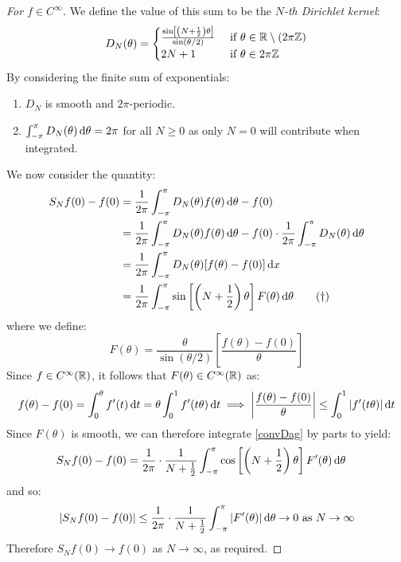 \documentclass[../main.tex]{subfiles}
\begin{document}
\begin{proof}[For $f \in C^\infty$]
  We define the value of this sum to be the \textit{$N$-th Dirichlet kernel}:
  \[
    D_{N}(\theta) = \begin{cases}
    \frac{\sin\left[\left(N + \frac{1}{2}\right)\theta\right]}{\sin(\theta/2)} & \text{ if } \theta \in \mathbb{R} \setminus (2 \pi \mathbb{Z}) \\
    2N + 1 & \text{ if } \theta \in 2 \pi \mathbb{Z}
    \end{cases}
  \]
  By considering the finite sum of exponentials:
  \begin{enumerate}
    \item $D_N$ is smooth and $2\pi$-periodic.
    \item $\int_{-\pi}^{\pi} D_{N}(\theta) \d{\theta} = 2 \pi$ for all $N \geq 0$ as only $N = 0$ will contribute when integrated.
  \end{enumerate}
  We now consider the quantity:
  \begin{align}
    S_{N}f(0) - f(0) &= \frac{1}{2\pi} \int_{-\pi}^{\pi} D_N(\theta) f(\theta) \d{\theta} - f(0) \nonumber \\
                     &= \frac{1}{2\pi} \int_{-\pi}^{\pi} D_N(\theta) f(\theta) \d{\theta} - f(0) \cdot \frac{1}{2\pi} \int_{-\pi}^{\pi} D_N(\theta) \d{\theta} \nonumber \\
                     &= \frac{1}{2\pi} \int_{-\pi}^{\pi} D_N(\theta)[f(\theta) - f(0)] \d{x} \nonumber \\
                     &= \frac{1}{2\pi} \int_{-\pi}^{\pi} \sin\left[\left(N + \frac{1}{2}\right)\theta\right] F(\theta) \d{\theta} \tag{$\dag$} \label{convDag}
  \end{align}
  where we define:
  \[
    F(\theta) = \frac{\theta}{\sin(\theta/2)} \left[\frac{f(\theta) - f(0)}{\theta}\right]
  \]
  Since $f \in C^{\infty}(\mathbb{R})$, it follows that $F(\theta) \in C^{\infty}(\mathbb{R})$ as:
  \[
    f(\theta) - f(0) = \int_{0}^{\theta} f'(t) \d{t} = \theta \int_{0}^{1} f'(t \theta) \d{t} \implies \abs{\frac{f(\theta) - f(0)}{\theta}} \leq \int_{0}^{1} |f'(t \theta)| \d{t}
  \]
  Since $F(\theta)$ is smooth, we can therefore integrate \cref{convDag} by parts to yield:
  \begin{align*}
    S_{N} f(0) - f(0) &= \frac{1}{2 \pi} \cdot \frac{1}{N + \frac{1}{2}} \int_{-\pi}^{\pi} \cos\left[\left(N + \frac{1}{2}\right)\theta\right] F'(\theta) \d{\theta}
  \end{align*}
  and so:
  \[
    |S_N f(0) - f(0)| \leq \frac{1}{2\pi} \cdot \frac{1}{N + \frac{1}{2}} \int_{-\pi}^{\pi} |F'(\theta)| \d{\theta} \to 0 \text{ as $N \to \infty$}
  \]
  Therefore $S_N f(0) \to f(0)$ as $N \to \infty$, as required.
\end{proof}
\end{document}
